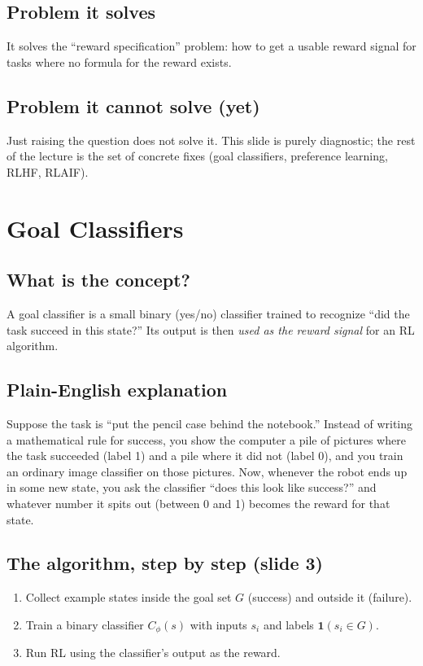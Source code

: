 \documentclass[11pt]{article}
\begin{document}
\subsection{Problem it solves}
It solves the ``reward specification'' problem: how to get a usable reward signal
for tasks where no formula for the reward exists.

\subsection{Problem it cannot solve (yet)}
Just raising the question does not solve it. This slide is purely diagnostic; the
rest of the lecture is the set of concrete fixes (goal classifiers, preference
learning, RLHF, RLAIF).

\section{Goal Classifiers}

\subsection{What is the concept?}
A goal classifier is a small binary (yes/no) classifier trained to recognize
``did the task succeed in this state?'' Its output is then \emph{used as the
reward signal} for an RL algorithm.

\subsection{Plain-English explanation}
Suppose the task is ``put the pencil case behind the notebook.'' Instead of
writing a mathematical rule for success, you show the computer a pile of pictures
where the task succeeded (label 1) and a pile where it did not (label 0), and you
train an ordinary image classifier on those pictures. Now, whenever the robot ends
up in some new state, you ask the classifier ``does this look like success?'' and
whatever number it spits out (between 0 and 1) becomes the reward for that state.

\subsection{The algorithm, step by step (slide 3)}
\begin{enumerate}
  \item Collect example states inside the goal set $G$ (success) and outside it
  (failure).
  \item Train a binary classifier $C_\phi(s)$ with inputs $s_i$ and labels
  $\mathbf{1}(s_i \in G)$.
  \item Run RL using the classifier's output as the reward.
\end{enumerate}
\end{document}
